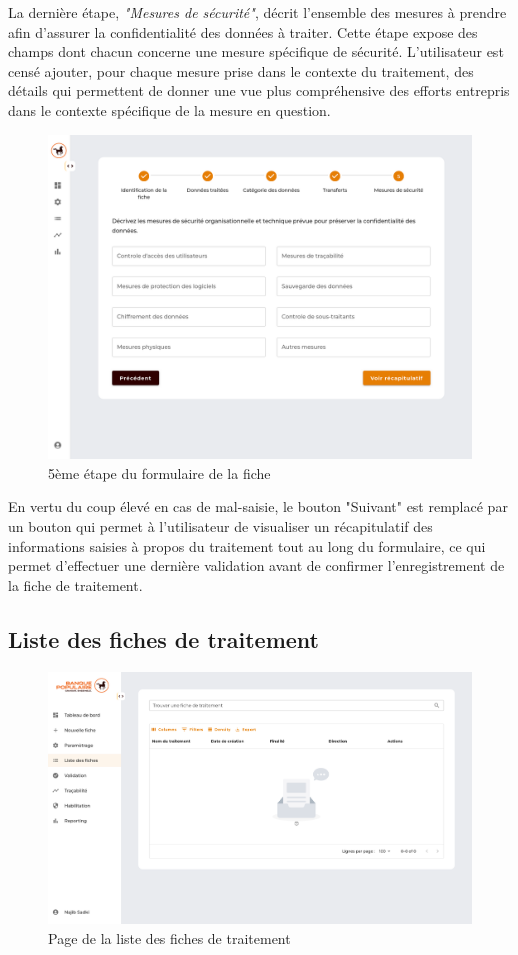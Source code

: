 \clearpage

\noindent 
La dernière étape, \textit{"Mesures de sécurité"}, décrit l'ensemble des mesures à prendre afin d'assurer la confidentialité des données à traiter. Cette étape expose des champs dont chacun concerne une mesure spécifique de sécurité. L'utilisateur est censé ajouter, pour chaque mesure prise dans le contexte du traitement, des détails qui permettent de donner une vue plus compréhensive des efforts entrepris dans le contexte spécifique de la mesure en question. \\


\begin{figure}[H]
    \centering
    \includegraphics[width=\textwidth]{images/guis/nouvelle-fiche/nouvelle-fiche-5.png} 
    \caption{5ème étape du formulaire de la fiche}
\end{figure}

\noindent En vertu du coup élevé en cas de mal-saisie, le bouton "Suivant" est remplacé par un bouton qui permet à l'utilisateur de visualiser un récapitulatif des informations saisies à propos du traitement tout au long du formulaire, ce qui permet d'effectuer une dernière validation avant de confirmer l'enregistrement de la fiche de traitement. 


\subsection{Liste des fiches de traitement}

\begin{figure}[H]
    \centering
    \includegraphics[width=1.35\textwidth, angle=90]{images/fiches.png}
    \caption{Page de la liste des fiches de traitement}
\end{figure}

\clearpage






